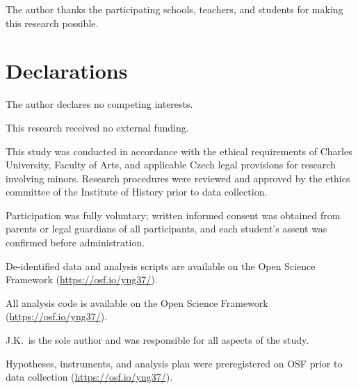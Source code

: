 \documentclass[pdflatex,sn-apa]{sn-jnl}%
\begin{document}
\backmatter


The author thanks the participating schools, teachers, and students for making this research possible.

\section*{Declarations}

 The author declares no competing interests.

 This research received no external funding.

 This study was conducted in accordance with the ethical requirements of Charles University, Faculty of Arts, and applicable Czech legal provisions for research involving minors. Research procedures were reviewed and approved by the ethics committee of the Institute of History prior to data collection.

 Participation was fully voluntary; written informed consent was obtained from parents or legal guardians of all participants, and each student's assent was confirmed before administration.

 De-identified data and analysis scripts are available on the Open Science Framework (\url{https://osf.io/yng37/}).

 All analysis code is available on the Open Science Framework (\url{https://osf.io/yng37/}).

 J.K.\ is the sole author and was responsible for all aspects of the study.

 Hypotheses, instruments, and analysis plan were preregistered on OSF prior to data collection (\url{https://osf.io/yng37/}).


\end{document}
